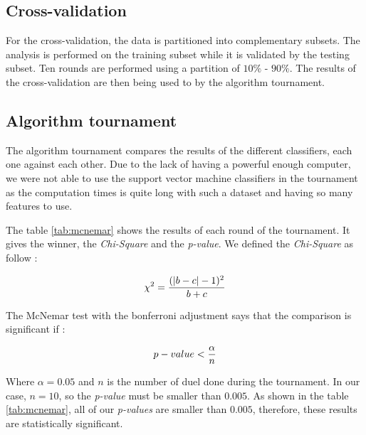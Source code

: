 \subsection{Cross-validation}

For the cross-validation, the data is partitioned into complementary subsets.
The analysis is performed on the training subset while it is validated by the 
testing subset. Ten rounds are performed using a partition of $10\%$ - $90\%$.
The results of the cross-validation are then being used to by the 
algorithm tournament.

\subsection{Algorithm tournament}

The algorithm tournament compares the results of the different classifiers, 
each one against each other.
Due to the lack of having a powerful enough computer, we were not able to use 
the support vector machine classifiers in the tournament as the computation 
times is quite long with such a dataset and having so many features to use.

The table \ref{tab:mcnemar} shows the results of each round of the tournament. 
It gives the winner, the \emph{Chi-Square} and the \emph{p-value}. We defined 
the \emph{Chi-Square} as follow :

\begin{equation} \label{eq:chi-squared2}
  \chi^2 = {(|b-c|-1)^2 \over b+c}
\end{equation}

The McNemar test with the bonferroni adjustment says that the comparison is
significant if :

\begin{equation} \label{eq:bonferroni}
	p-value < {\alpha \over n}
\end{equation}

Where $\alpha = 0.05$ and $n$ is the number of duel done during the tournament. 
In our case, $n = 10$, so the \emph{p-value} must be smaller than $0.005$. As 
shown in the table \ref{tab:mcnemar}, all of our \emph{p-values} are smaller 
than $0.005$, therefore, these results are statistically significant.

